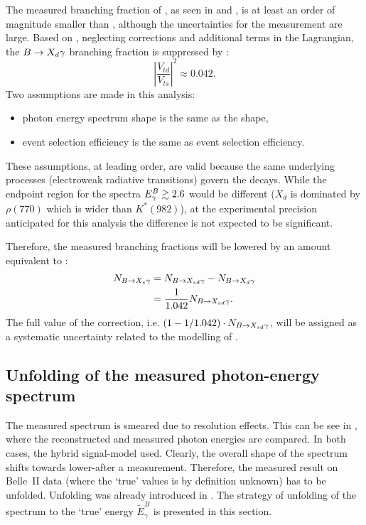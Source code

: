 The measured branching fraction of \BtoXdgamma, 
as seen in  and , is at least an order of magnitude smaller than \BtoXsgamma,
although the uncertainties for the measurement are large.
Based on , neglecting corrections and additional terms in the Lagrangian, the $\BtoXdgamma$ branching fraction
is suppressed by \cite{Workman:2022ynf}:
\begin{equation}\label{eq:btodgamma_suppression}
    \left|\frac{V_{td}}{V_{ts}}\right|^2 \approx 0.042.
\end{equation}
Two assumptions are made in this analysis:
\begin{itemize}
    \item \BtoXdgamma photon energy spectrum shape is the same as the \BtoXsgamma shape,
    \item \BtoXdgamma event selection efficiency is the same as \BtoXsgamma event selection efficiency.
\end{itemize}
These assumptions, at leading order, are valid because the same underlying processes (electroweak radiative transitions) govern the decays.
While the endpoint region for the spectra ${E^B_{\gamma}}\gtrsim2.6$ would be different  ($X_d$ is dominated by $\rho(770)$ 
which is wider than $K^*(982)$), at the experimental precision anticipated for this analysis the difference is not expected to be significant.

Therefore, the measured \BtoXsdgamma branching fractions will be lowered by an amount equivalent to :
\begin{align}\label{eq:btodgamma_subtraction}
    \begin{split}
    N_{\BtoXsgamma} &= N_{\BtoXsdgamma} - N_{\BtoXdgamma}\\
                    &=\frac{1}{1.042} N_{\BtoXsdgamma}.
    \end{split}
\end{align}
The full value of the correction, i.e. $(1-1/1.042) \cdot N_{\BtoXsdgamma}$, will be assigned as a systematic uncertainty related to the modelling of \BtoXdgamma.

\subsection{Unfolding of the measured photon-energy spectrum} \label{sec:signal_unfolding}

The measured \EB spectrum is smeared due to resolution effects.
This can be see in , where the reconstructed and measured photon energies are compared.
In both cases, the hybrid signal-model used.
Clearly, the overall shape of the spectrum shifts towards lower-\EB after a measurement.
Therefore, the measured result on Belle~II data (where the `true' values is by definition unknown) has to be unfolded.
Unfolding was already introduced in .
The strategy of unfolding of the \EB spectrum to the `true' energy $\tilde{E}_{\gamma}^B$ is presented in this section.


